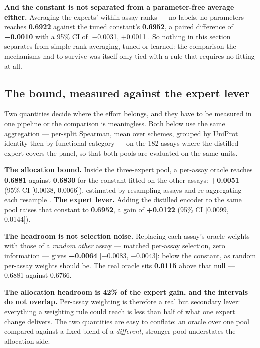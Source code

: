 \documentclass{article}
\begin{document}
\textbf{And the constant is not separated from a parameter-free average either.} Averaging the experts' within-assay
ranks --- no labels, no parameters --- reaches \textbf{0.6922} against the tuned constant's \textbf{0.6952}, a paired difference of
\textbf{−0.0010} with a 95\% CI of {[}−0.0031, +0.0011{]}. So nothing in this section separates from simple rank averaging,
tuned or learned: the comparison the mechanisms had to survive was itself only tied with a rule that requires no
fitting at all.

\subsection{The bound, measured against the expert lever}\label{the-bound-measured-against-the-expert-lever}

Two quantities decide where the effort belongs, and they have to be measured in one pipeline or the
comparison is meaningless. Both below use the same aggregation --- per-split Spearman, mean over schemes,
grouped by UniProt identity then by functional category --- on the 182 assays where the distilled expert
covers the panel, so that both pools are evaluated on the same units.

\textbf{The allocation bound.} Inside the three-expert pool, a per-assay oracle reaches \textbf{0.6881} against
\textbf{0.6830} for the constant fitted on the other assays: \textbf{+0.0051} (95\% CI {[}0.0038, 0.0066{]}), estimated by
resampling assays and re-aggregating each resample \cite{efron1993bootstrap}. \textbf{The expert lever.} Adding the distilled encoder to the
same pool raises that constant to \textbf{0.6952}, a gain of \textbf{+0.0122} (95\% CI {[}0.0099, 0.0144{]}).

\textbf{The headroom is not selection noise.} Replacing each assay's oracle weights with those of a \emph{random other} assay
--- matched per-assay selection, zero information --- gives \textbf{−0.0064} {[}−0.0083, −0.0043{]}: below the constant, as random
per-assay weights should be. The real oracle sits \textbf{0.0115} above that null --- 0.6881 against 0.6766.

\textbf{The allocation headroom is 42\% of the expert gain, and the intervals do not overlap.} Per-assay weighting
is therefore a real but secondary lever: everything a weighting rule could reach is less than half of what
one expert change delivers. The two quantities are easy to conflate: an oracle over one pool compared against a fixed blend of a
\emph{different}, stronger pool understates the allocation side.
\end{document}
